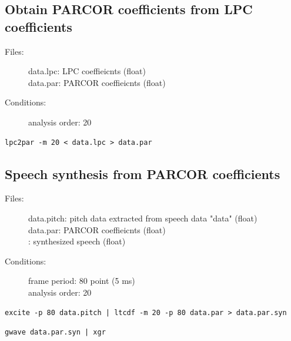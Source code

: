 \documentclass[a4paper]{article}
\begin{document}
\subsection{Obtain PARCOR coefficients from LPC coefficients}

\begin{description}
\item[Files:] 
   data.lpc: LPC coeffieicnts (float)\\
   data.par: PARCOR coeffieicnts (float)
\item[Conditions:]
  analysis order: 20
\end{description}

\begin{verbatim}
lpc2par -m 20 < data.lpc > data.par
\end{verbatim}

\subsection{Speech synthesis from PARCOR coefficients}
\begin{description}
\item[Files:]
  data.pitch: pitch data extracted from speech data "data" (float)\\
  data.par: PARCOR coeffieicnts (float)\\
  : 
  synthesized speech (float)
\item[Conditions:]
  frame period: 80 point (5 ms)\\
  analysis order: 20
\end{description}

\begin{verbatim}
excite -p 80 data.pitch | ltcdf -m 20 -p 80 data.par > data.par.syn
\end{verbatim}

\begin{verbatim}
gwave data.par.syn | xgr
\end{verbatim}
\end{document}
